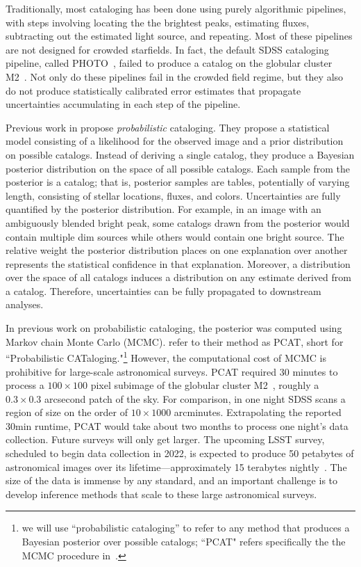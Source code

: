 Traditionally, most cataloging has been done using purely algorithmic pipelines, with steps involving locating the the brightest peaks, estimating fluxes, subtracting out the estimated light source, and repeating. 
Most of these pipelines are not designed for crowded starfields.
In fact, the default SDSS cataloging pipeline, called PHOTO~\cite{lupton2001sdss}, failed to 
produce a catalog on 
the globular cluster M2~\cite{Portillo_2017}. 
Not only do these pipelines fail in the crowded field
regime, but they also do not produce statistically calibrated error estimates that propagate 
uncertainties accumulating in each step of the pipeline. 

Previous work in \cite{Brewer_2013, Portillo_2017, Feder_2019}
propose {\itshape probabilistic} cataloging.
They propose a statistical model consisting of a likelihood for the observed image and a prior distribution on possible catalogs. Instead of deriving a single catalog, they produce a Bayesian posterior distribution on the space of all possible catalogs. 
Each sample from the posterior is a catalog; that is, posterior samples are tables, potentially of varying length, consisting of stellar locations, fluxes, and colors. 
Uncertainties are fully quantified by the posterior distribution. 
For example, in an image with an ambiguously blended bright peak, some catalogs drawn from the posterior would contain multiple dim sources while others would contain one bright source. 
The relative weight the posterior distribution places on one explanation over another represents the statistical confidence in that explanation. 
Moreover, a distribution over the space of all catalogs induces a distribution on any estimate derived from a catalog. Therefore, uncertainties can be fully propagated to downstream analyses.  

In previous work on probabilistic cataloging, the posterior was computed using Markov chain Monte Carlo (MCMC).
\cite{Portillo_2017, Feder_2019} refer to their method as PCAT, short for ``Probabilistic CATaloging."\footnote{
we will 
use ``probabilistic cataloging'' to refer to any method that produces a Bayesian posterior over possible catalogs; ``PCAT" refers specifically the the MCMC procedure in~\cite{Portillo_2017, Feder_2019}. }
However, the computational cost of MCMC is prohibitive for large-scale astronomical surveys. 
PCAT required 30 minutes to process a $100\times 100$ pixel subimage of the globular cluster M2~\cite{Feder_2019}, roughly a $0.3\times0.3$ arcsecond patch of the sky.
For comparison, in one night SDSS scans a region of size on the order of $10 \times 1000$ arcminutes. Extrapolating the reported 30min runtime, PCAT would take about two months to process one night's data collection.
Future surveys will only get larger. 
The upcoming LSST survey, scheduled to begin data collection in 2022, is expected to produce 50 petabytes of astronomical images over its lifetime---approximately 15 terabytes nightly~\cite{LSST_about}. 
The size of the data is immense by any standard, and an important challenge is to develop inference methods that scale to these large astronomical surveys. 

